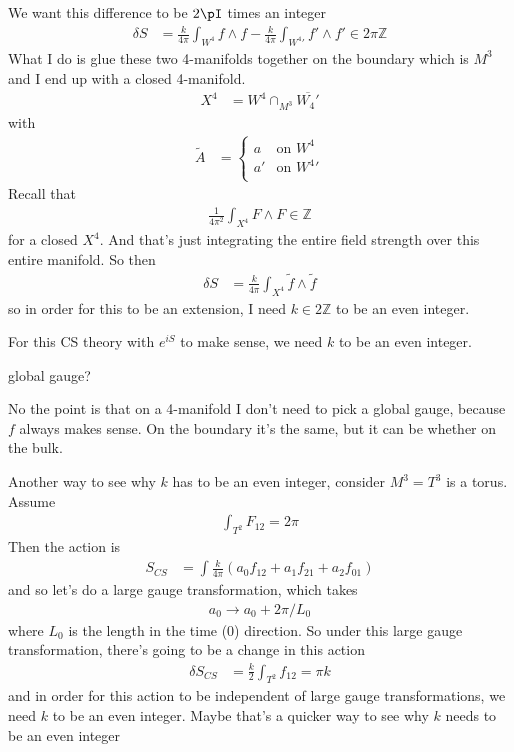 We want this difference to be $2\pI$ times an integer
\begin{align}
    \delta S &=
    \frac{k}{4\pi} \int_{W^4}f \wedge f
    - \frac{k}{4\pi} \int_{W^4'} f' \wedge f'
    \in 2\pi\mathbb{Z}
\end{align}
What I do is glue these two 4-manifolds together on the boundary which is $M^3$
and I end up with a closed 4-manifold.
\begin{align}
    X^4 &= W^4 \cap_{M^3} \overline{W_4'}
\end{align}
with
\begin{align}
    \tilde{A} &=
    \begin{cases}
        a & \text{on } W^4\\
        a' & \text{on } W^4'\\
    \end{cases}
\end{align}
Recall that
\begin{align}
    \frac{1}{4\pi^2}
    \int_{X^4} F\wedge F \in \mathbb{Z}
\end{align}
for a closed $X^4$.
And that's just integrating the entire field strength over this entire manifold.
So then
\begin{align}
    \delta S
    &=
    \frac{k}{4\pi}
    \int _{X^4} \tilde{f} \wedge \tilde{f}
\end{align}
so in order for this to be an extension,
I need $k\in 2\mathbb{Z}$ to be an even integer.

For this CS theory with $e^{iS}$ to make sense,
we need $k$ to be an even integer.

\begin{question}
    global gauge?
\end{question}
No the point is that on a 4-manifold I don't need to pick a global gauge,
because $f$ always makes sense.
On the boundary it's the same,
but it can be whether on the bulk.

Another way to see why $k$ has to be an even integer,
consider $M^3=T^3$ is a torus.
Assume
\begin{align}
    \int_{T^2} F_{12} = 2\pi
\end{align}
Then the action is
\begin{align}
    S_{CS} &=
    \int
    \frac{k}{4\pi}
    \left( 
    a_0 f_{12}
    +
    a_1 f_{21}
    +
    a_2 f_{01}
    \right)
\end{align}
and so let's do a large gauge transformation,
which takes
\begin{align}
    a_0 \to a_0 + 2\pi/L_0
\end{align}
where $L_0$ is the length in the time (0) direction.
So under this large gauge transformation,
there's going to be a change in this action
\begin{align}
    \delta S_{CS}
    &=
    \frac{k}{2}
    \int_{T^2}
    f_{12}
    =\pi k
\end{align}
and in order for this action to be independent of large gauge transformations,
we need $k$ to be an even integer.
Maybe that's a quicker way to see why $k$ needs to be an even integer

